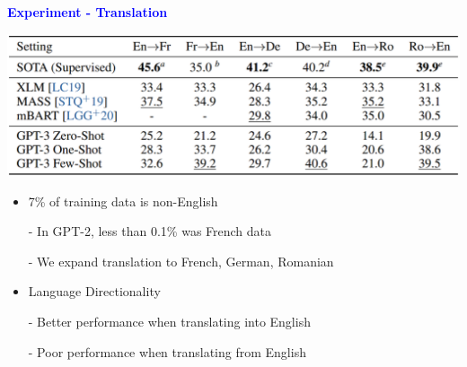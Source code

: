 \documentclass[professionalfont]{beamer}
\begin{document}
\begin{frame}
\begin{center}
    { \textbf{\textcolor{blue}{ {\fontsize{12}{14}\selectfont Experiment - Translation} }} }
\end{center}

\begin{center}
    \includegraphics[width=1.0\textwidth]{table/3-4.png}
\end{center}

{\fontsize{10}{14}\selectfont 
\begin{itemize}
    \item 7\% of training data is non-English

    - In GPT-2, less than 0.1\% was French data

    - We expand translation to French, German, Romanian

    \item Language Directionality

    - Better performance when translating into English

    - Poor performance when translating from English

\end{itemize}
}

\end{frame}
\end{document}
